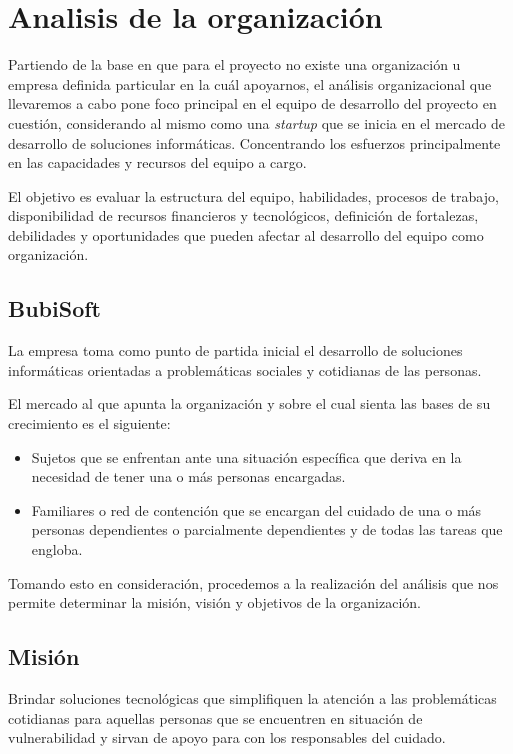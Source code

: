 \documentclass[a4paper,12pt]{article}
\begin{document}
    \newpage

    \tableofcontents 
    
    \newpage

    \section{Analisis de la organización}
    \par Partiendo de la base en que para el proyecto no existe una organización u empresa definida particular en la cuál apoyarnos, el análisis organizacional que llevaremos a cabo pone foco principal en el equipo de desarrollo del proyecto en cuestión, considerando al mismo como una \textit{startup} que se inicia en el mercado de desarrollo de soluciones informáticas. Concentrando los esfuerzos principalmente en las capacidades y recursos del equipo a cargo.
    \par El objetivo es evaluar la estructura del equipo, habilidades, procesos de trabajo, disponibilidad de recursos financieros y tecnológicos, definición de fortalezas, debilidades y oportunidades que pueden afectar al desarrollo del equipo como organización.
    \subsection{BubiSoft}
    \par La empresa toma como punto de partida inicial el desarrollo de soluciones informáticas orientadas a problemáticas sociales y cotidianas de las personas.
    \par El mercado al que apunta la organización y sobre el cual sienta las bases de su crecimiento es el siguiente:
    \begin{itemize}
        \item Sujetos que se enfrentan ante una situación específica que deriva en la necesidad de tener una o más personas encargadas.
        \item Familiares o red de contención que se encargan del cuidado de una o más personas dependientes o parcialmente dependientes y de todas las tareas que engloba.
    \end{itemize}
    \par Tomando esto en consideración, procedemos a la realización del análisis que nos permite determinar la misión, visión y objetivos de la organización.
    \subsection{Misión}
    \par Brindar soluciones tecnológicas que simplifiquen la atención a las problemáticas cotidianas para aquellas personas que se encuentren en situación de vulnerabilidad y sirvan de apoyo para con los responsables del cuidado.
\end{document}
